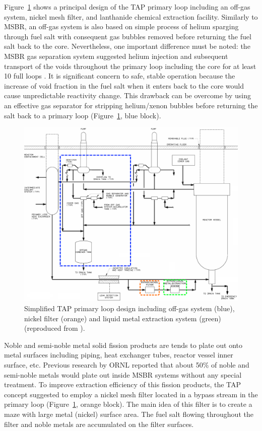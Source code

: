 \documentclass[12pt]{article} %
\begin{document}
Figure~\ref{fig:tap-reproc} shows a principal design of the \gls{TAP} primary loop including 
an off-gas system, nickel mesh filter, and lanthanide chemical 
extraction facility. Similarly to \gls{MSBR}, an off-gas system is 
also based on simple process of helium sparging through fuel salt 
with consequent gas bubbles removed before returning the 
fuel salt back to the core. Nevertheless, one important difference must be noted: the
\gls{MSBR} gas separation system suggested helium injection and subsequent 
transport of the voids throughout the primary loop including the core 
for at least 10 full loops \cite{robertson_conceptual_1971}. It is 
significant concern to safe, stable 
operation because the increase of void fraction in the fuel salt when it enters back 
to the core 
would cause unpredictable reactivity change. This drawback can be overcome by 
using an effective gas separator for stripping helium/xenon bubbles before 
returning the salt back to a primary loop (Figure~\ref{fig:tap-reproc}, blue 
block). 
\begin{figure}[htp!] %
  \centering
		  \includegraphics[width=\textwidth]{tap_primary_loop.png}
  \caption{Simplified \gls{TAP} primary loop design including off-gas system (blue), 
  nickel filter (orange) and liquid metal extraction system (green) (reproduced from \cite{transatomic_power_transatomic_2019}).}
  \label{fig:tap-reproc}
\end{figure}

Noble and semi-noble metal solid fission products are tends to plate out onto metal 
surfaces including piping, heat exchanger tubes, reactor vessel inner surface, etc. 
Previous research by \gls{ORNL} \cite{robertson_conceptual_1971} reported that 
about 50\% of noble and semi-noble metals would plate out inside \gls{MSBR} 
systems without any special treatment. To improve extraction efficiency of this 
fission products, the \gls{TAP} concept suggested to employ a 
nickel mesh filter located 
in a bypass stream in the primary loop (Figure~\ref{fig:tap-reproc}, orange block). 
The main idea of this filter is to create a maze with large metal (nickel) 
surface area. The fuel salt flowing throughout the filter and noble 
metals are accumulated on the filter surfaces. 
\end{document}
